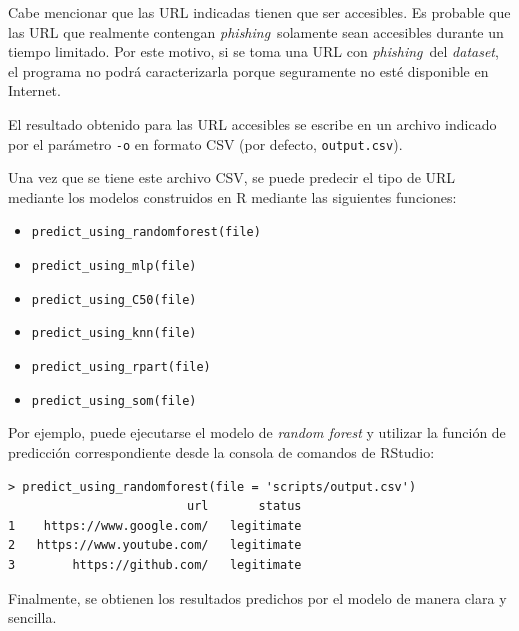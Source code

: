 \documentclass[12pt, a4paper]{article}
\renewcommand{\textit}{\textsl}
\newcommand*{\dataset}{\textit{dataset}}
\newcommand*{\phishing}{\textit{phishing}}
\begin{document}
    Cabe mencionar que las URL indicadas tienen que ser accesibles. Es probable que las URL que realmente contengan \phishing\ solamente sean accesibles durante un tiempo limitado. Por este motivo, si se toma una URL con \phishing\ del \dataset, el programa no podrá caracterizarla porque seguramente no esté disponible en Internet.

    El resultado obtenido para las URL accesibles se escribe en un archivo indicado por el parámetro \texttt{-o} en formato CSV (por defecto, \texttt{output.csv}).

    Una vez que se tiene este archivo CSV, se puede predecir el tipo de URL mediante los modelos construidos en R mediante las siguientes funciones:

    \begin{itemize}
      \item \texttt{predict\_using\_randomforest(file)}
      \item \texttt{predict\_using\_mlp(file)}
      \item \texttt{predict\_using\_C50(file)}
      \item \texttt{predict\_using\_knn(file)}
      \item \texttt{predict\_using\_rpart(file)}
      \item \texttt{predict\_using\_som(file)}
    \end{itemize}

    Por ejemplo, puede ejecutarse el modelo de \textit{random forest} y utilizar la función de predicción correspondiente desde la consola de comandos de RStudio:

    \newpage

    \begin{verbatim}
> predict_using_randomforest(file = 'scripts/output.csv')
                         url       status
1    https://www.google.com/   legitimate
2   https://www.youtube.com/   legitimate
3        https://github.com/   legitimate
    \end{verbatim}

    Finalmente, se obtienen los resultados predichos por el modelo de manera clara y sencilla.
\end{document}
